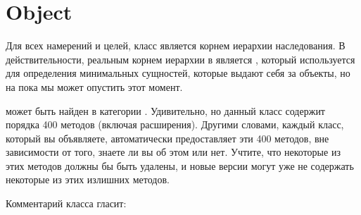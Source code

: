 \documentclass[a4paper,10pt,twoside]{book}
\begin{document}
\section{Object}
Для всех намерений и целей, класс  является корнем иерархии наследования. В действительности, реальным корнем иерархии в \pharo является , который используется для определения минимальных сущностей, которые выдают себя за объекты, но на пока мы может опустить этот момент.

 может быть найден в категории . Удивительно, но данный класс содержит порядка 400 методов (включая расширения). Другими словами, каждый класс, который вы объявляете, автоматически предоставляет эти 400 методов, вне зависимости от того, знаете ли вы об этом или нет. Учтите, что некоторые из этих методов должны бы быть удалены, и новые версии \pharo могут уже не содержать некоторые из этих излишних методов.

Комментарий класса  гласит:
\end{document}

